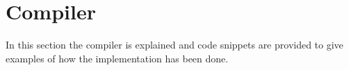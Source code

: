 \section{Compiler}
In this section the compiler is explained and code snippets are provided to give examples of how the implementation has been done.






